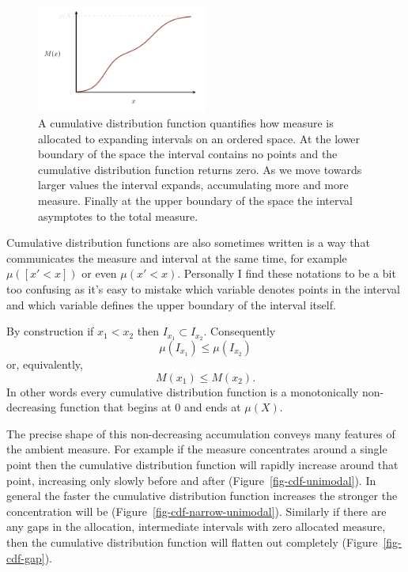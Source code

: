 \documentclass[
  letterpaper,
  DIV=11,
  numbers=noendperiod]{scrartcl}
\begin{document}
\begin{figure}

{\centering \includegraphics[width=0.5\textwidth,height=\textheight]{figures/cdfs/cdf/cdf.pdf}

}

\caption{\label{fig-cdf-basics}A cumulative distribution function
quantifies how measure is allocated to expanding intervals on an ordered
space. At the lower boundary of the space the interval contains no
points and the cumulative distribution function returns zero. As we move
towards larger values the interval expands, accumulating more and more
measure. Finally at the upper boundary of the space the interval
asymptotes to the total measure.}

\end{figure}

Cumulative distribution functions are also sometimes written is a way
that communicates the measure and interval at the same time, for example
\(\mu([x' < x])\) or even \(\mu(x' < x)\). Personally I find these
notations to be a bit too confusing as it's easy to mistake which
variable denotes points in the interval and which variable defines the
upper boundary of the interval itself.

By construction if \(x_{1} < x_{2}\) then
\(I_{x_{1}} \subset I_{x_{2}}\). Consequently \[
\mu(I_{x_{1}}) \le \mu(I_{x_{2}})
\] or, equivalently, \[
M(x_{1}) \le M(x_{2}).
\] In other words every cumulative distribution function is a
monotonically non-decreasing function that begins at \(0\) and ends at
\(\mu(X)\).

The precise shape of this non-decreasing accumulation conveys many
features of the ambient measure. For example if the measure concentrates
around a single point then the cumulative distribution function will
rapidly increase around that point, increasing only slowly before and
after (Figure~\ref{fig-cdf-unimodal}). In general the faster the
cumulative distribution function increases the stronger the
concentration will be (Figure~\ref{fig-cdf-narrow-unimodal}). Similarly
if there are any gaps in the allocation, intermediate intervals with
zero allocated measure, then the cumulative distribution function will
flatten out completely (Figure~\ref{fig-cdf-gap}).
\end{document}
